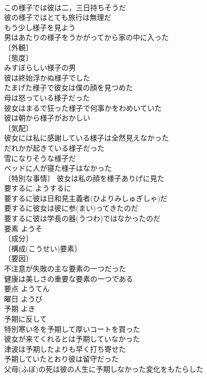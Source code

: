 \documentclass[8pt]{extreport}
\begin{document}
\begin{CJK}{UTF8}{min}
\\	この様子では彼は二，三日持ちそうだ 
\\	彼の様子ではとても旅行は無理だ 
\\	もう少し様子を見よう 
\\	男はあたりの様子をうかがってから家の中に入った 
\\	〔外観〕
\\	〔態度〕
\\	みすぼらしい様子の男 
\\	彼は終始浮かぬ様子でした 
\\	たまげた様子で彼女は僕の顔を見つめた 
\\	母は怒っている様子だった 
\\	彼女はまるで狂った様子で何事かをわめいていた 
\\	彼は朝から様子がおかしい 
\\	〔気配〕
\\	彼女には私に感謝している様子は全然見えなかった 
\\	だれかが起きている様子だった 
\\	雪になりそうな様子だ 
\\	ベッドに人が寝た様子はなかった 
\\	〔特別な事情〕 彼女は私の顔を様子ありげに見た 
\\	要するに	ようするに	
\\	要するに彼は日和見主義者(ひよりみしゅぎしゃ)だ 
\\	要するに彼女は彼に参(まい)ってきたのだ 
\\	要するに彼は学長の器(うつわ)ではなかったのだ 
\\	要素	ようそ	
\\	〔成分〕
\\	〔構成(こうせい)要素〕
\\	〔要因〕
\\	不注意が失敗の主な要素の一つだった 
\\	健康は美しさの重要な要素の一つである 
\\	要点	ようてん	
\\	曜日	ようび	
\\	予期	よき	
\\	予期に反して 
\\	特別寒い冬を予期して厚いコートを買った 
\\	彼女が来てくれるとは予期していなかった 
\\	津波は予期したよりも早く打ち寄せた 
\\	予期していたとおり彼は留守だった 
\\	父母(ふぼ)の死は彼の人生に予期しなかった変化をもたらした 

\end{CJK}
\end{document}
